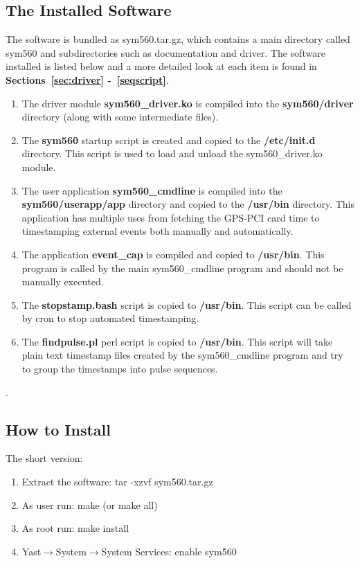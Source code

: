 \documentclass[11pt]{article}
\begin{document}
    \subsection{The Installed Software} \label{subsec:whatinstall}
    The software is bundled as sym560.tar.gz, which contains a main directory called sym560 and subdirectories such as documentation and driver.
    The software installed is listed below and a more detailed look at each item is found in \textbf{Sections~\ref{sec:driver} -~\ref{seqscript}}.
    \begin{enumerate}
        \item The driver module \textbf{sym560\_driver.ko} is compiled into the \textbf{sym560/driver} directory (along with some intermediate files).
        \item The \textbf{sym560} startup script is created and copied to the \textbf{/etc/init.d} directory.
        This script is used to load and unload the sym560\_driver.ko module.
        \item The user application \textbf{sym560\_cmdline} is compiled into the \textbf{sym560/userapp/app} directory and copied to the \textbf{/usr/bin} directory.
        This application has multiple uses from fetching the GPS-PCI card time to timestamping external events both manually and automatically.
        \item The application \textbf{event\_cap} is compiled and copied to \textbf{/usr/bin}.
        This program is called by the main sym560\_cmdline program and should not be manually executed.
        \item The \textbf{stopstamp.bash} script is copied to \textbf{/usr/bin}.
        This script can be called by cron to stop automated timestamping.
        \item The \textbf{findpulse.pl} perl script is copied to \textbf{/usr/bin}.
        This script will take plain text timestamp files created by the sym560\_cmdline program and try to group the timestamps into pulse sequences.
    \end{enumerate}
    .

    \subsection{How to Install} \label{subsec:howinstall}
    The short version:
    \begin{enumerate}
        \item Extract the software: tar -xzvf sym560.tar.gz
        \item As user run: make (or make all)
        \item As root run: make install
        \item Yast$\rightarrow$System$\rightarrow$System Services: enable sym560
    \end{enumerate}
\end{document}
